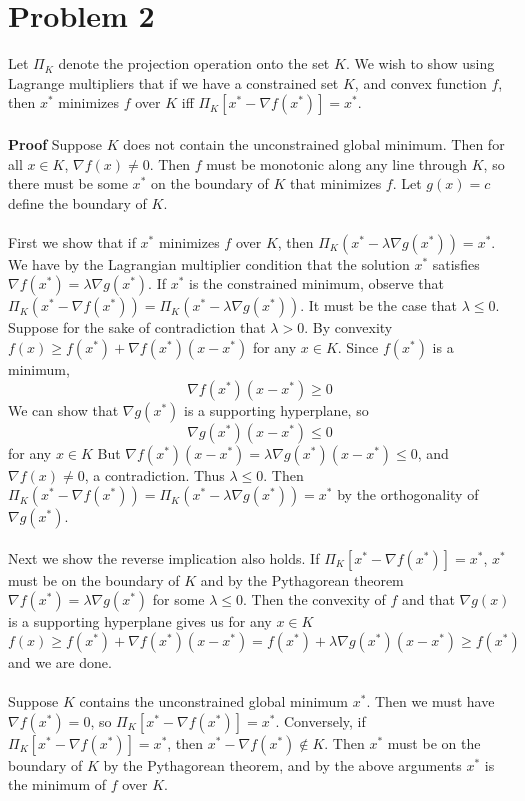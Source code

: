 \documentclass[a4paper,13pt]{article}
\begin{document}
\section*{Problem 2} 
Let $\Pi_K$ denote the projection operation onto the set $K$. We wish to show using Lagrange multipliers that if we have a constrained set $K$, and convex function $f$, then $x^*$ minimizes $f$ over $K$ iff $\Pi_K \left[ x^* - \nabla f(x^*) \right] = x^*$.
\\\\
\textbf{Proof}
Suppose $K$ does not contain the unconstrained global minimum. Then for all $x \in K$, $\nabla f(x) \neq 0$. Then $f$ must be monotonic along any line through $K$, so there must be some $x^*$ on the boundary of $K$ that minimizes $f$. Let $g(x) = c$ define the boundary of $K$. 
\\\\
First we show that if $x^*$ minimizes $f$ over $K$, then $\Pi_K (x^* - \lambda \nabla g(x^*)) = x^*$. We have by the Lagrangian multiplier condition that the solution $x^*$ satisfies $\nabla f(x^*) = \lambda \nabla g(x^*)$. If $x^*$ is the constrained minimum, observe that $\Pi_K (x^* - \nabla f(x^*)) = \Pi_K (x^* - \lambda \nabla g(x^*))$. It must be the case that $\lambda \leq 0$. Suppose for the sake of contradiction that $\lambda > 0$. By convexity $f(x) \geq f(x^*) + \nabla f(x^*) (x-x^*)$ for any $x \in K$. Since $f(x^*)$ is a minimum, 
$$\nabla f(x^*) (x-x^*) \geq 0$$
We can show that $\nabla g(x^*)$ is a supporting hyperplane, so 
$$\nabla g(x^*) (x-x^*) \leq 0$$
for any $x \in K$ But $\nabla f(x^*) (x-x^*) = \lambda \nabla g(x^*) (x-x^*) \leq 0$, and $\nabla f(x) \neq 0$, a contradiction. Thus $\lambda \leq 0$. Then $\Pi_K (x^* - \nabla f(x^*)) = \Pi_K (x^* - \lambda \nabla g(x^*)) = x^*$ by the orthogonality of $\nabla g(x^*)$.
\\\\
Next we show the reverse implication also holds. If $\Pi_K \left[ x^* - \nabla f(x^*) \right] = x^*$, $x^*$ must be on the boundary of $K$ and by the Pythagorean theorem $\nabla f(x^*) = \lambda \nabla g(x^*)$ for some $\lambda \leq 0$. Then the convexity of $f$ and that $\nabla g(x)$ is a supporting hyperplane gives us for any $x \in K$ 
$$f(x) \geq f(x^*) + \nabla f(x^*) (x - x^*) = f(x^*) + \lambda \nabla g(x^*) (x - x^*) \geq f(x^*)$$
and we are done.
\\\\
Suppose $K$ contains the unconstrained global minimum $x^*$. Then we must have $\nabla f(x^*) = 0$, so $\Pi_K \left[ x^* - \nabla f(x^*) \right] = x^*$. Conversely, if $\Pi_K \left[ x^* - \nabla f(x^*) \right] = x^*$, then $x^* - \nabla f(x^*) \not\in K$. Then $x^*$ must be on the boundary of $K$ by the Pythagorean theorem, and by the above arguments $x^*$ is the minimum of $f$ over $K$.
\end{document}
